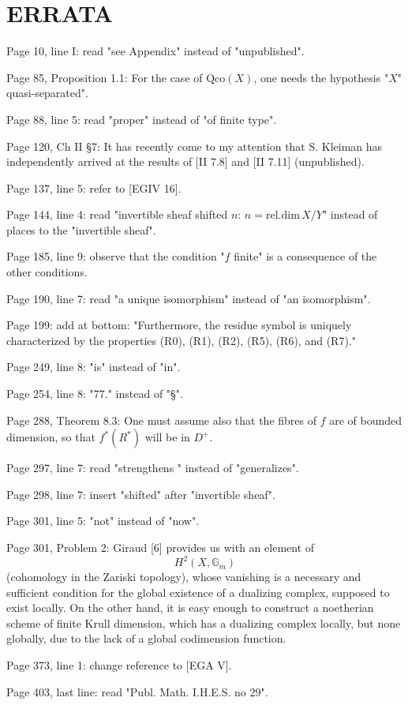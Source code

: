 \documentclass[12pt]{book}
\begin{document}
\section{ERRATA}

Page
10, line I: read "see Appendix" instead of "unpublished".

Page
85, Proposition 1.1: For the case of $\mathrm{Qco}(X)$, one needs the hypothesis "$X$" quasi-separated".

Page
88, line 5: read "proper" instead of "of finite type".

Page
120, Ch II §7: It has recently come to my attention that S. Kleiman has independently arrived at the results of [II 7.8] and [II 7.11] (unpublished).

Page
137, line 5: refer to [EGIV 16].

Page
144, line 4: read "invertible sheaf shifted $n$: $n=\mathrm{rel.dim}\,X/Y$" instead of places to the "invertible sheaf".

Page
185, line 9: observe that the condition "$f$ finite" is a consequence of the other conditions.

Page
190, line 7: read "a unique isomorphism" instead of "an isomorphism".

Page
199: add at bottom: "Furthermore, the residue symbol is uniquely characterized by the properties (R0), (R1), (R2), (R5), (R6), and (R7)."

Page
249, line 8: "is" instead of "in".

Page
254, line 8: "77." instead of "§".

Page
288, Theorem 8.3: One must assume also that the fibres of $f$ are of bounded dimension, so that $f^{*}(R^{*})$ will be in $D^{+}$.

Page
297, line 7: read "strengthens " instead of "generalizes".

Page
298, line 7: insert "shifted" after "invertible sheaf".

Page 301, line 5: "not" instead of "now".

Page 301, Problem 2: Giraud [6] provides us with an element of
\[H^{2}\left(X, \mathbb{G}_{m}\right)\]
(cohomology in the Zariski topology), whose vanishing is a necessary and sufficient condition for the global existence of a dualizing complex, supposed to exist locally. On the other hand, it is easy enough to construct a noetherian scheme of finite Krull dimension, which has a dualizing complex locally, but none globally, due to the lack of a global codimension function.

Page 373, line 1: change reference to [EGA V].

Page 403, last line: read "Publ. Math. I.H.E.S. no 29".
\end{document}
